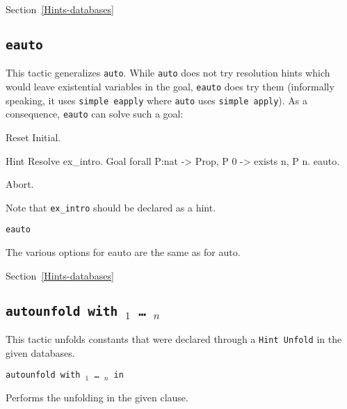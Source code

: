 \begin{coq_example*}
\SeeAlso Section~\ref{Hints-databases}

\subsection{\tt eauto}
\label{eauto}

This tactic generalizes {\tt auto}. While {\tt auto} does not try
resolution hints which would leave existential variables in the goal,
{\tt eauto} does try them (informally speaking, it uses
{\tt simple eapply} where {\tt auto} uses {\tt simple apply}).
As a consequence, {\tt eauto} can solve such a goal:

\begin{coq_eval}
Reset Initial.
\end{coq_eval}
\begin{coq_example}
Hint Resolve ex_intro.
Goal forall P:nat -> Prop, P 0 ->  exists n, P n.
eauto.
\end{coq_example}
\begin{coq_eval}
Abort.
\end{coq_eval}

Note that {\tt ex\_intro} should be declared as a hint.

\begin{Variants}

\item {\tt {}eauto \zeroone{\num}}  

  The various options for eauto are the same as for auto.

\end{Variants}

\SeeAlso Section~\ref{Hints-databases}

\subsection{\tt autounfold with \ident$_1$ \mbox{\dots} \ident$_n$}
\label{autounfold}

This tactic unfolds constants that were declared through a {\tt Hint
  Unfold} in the given databases.

\begin{Variants}
\item {\tt autounfold with \ident$_1$ \dots\ \ident$_n$ in }

  Performs the unfolding in the given clause.


\end{Variants}
\end{coq_example*}
